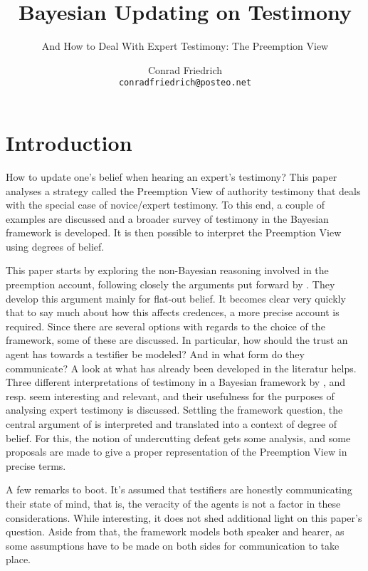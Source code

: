 \documentclass[11pt, a4paper]{scrartcl}
\title{\textbf{Bayesian Updating on Testimony} }
\subtitle{And How to Deal With Expert Testimony: The Preemption View}
\author{Conrad Friedrich \\ \texttt{conradfriedrich@posteo.net}}
\begin{document}
\maketitle
\thispagestyle{empty}
\tableofcontents
\newpage
\section{Introduction}

How to update one's belief when hearing an expert's testimony? This paper analyses a strategy called the Preemption View of authority testimony that deals with the special case of novice/expert testimony. To this end, a couple of examples are discussed and a broader survey of testimony in the Bayesian framework is developed. It is then possible to interpret the Preemption View using degrees of belief. 

This paper starts by exploring the non-Bayesian reasoning involved in the preemption account, following closely the arguments put forward by \textcite{Constantin2017}. They develop this argument mainly for flat-out belief. It becomes clear very quickly that to say much about how this affects credences, a more precise account is required. Since there are several options with regards to the choice of the framework, some of these are discussed. In particular, how should the trust an agent has towards a testifier be modeled? And in what form do they communicate? A look at what has already been developed in the literatur helps. Three different interpretations of testimony in a Bayesian framework by \textcite{Goldman1999-GOLKIA}, \textcite{Bovens2003} and \textcite{Olsson2013} resp. \textcite{Angere2010} seem interesting and relevant, and their usefulness for the purposes of analysing expert testimony is discussed. Settling the framework question, the central argument of \textcite{Constantin2017} is interpreted and translated into a context of degree of belief. For this, the notion of undercutting defeat gets some analysis, and some proposals are made to give a proper representation of the Preemption View in precise terms. 

A few remarks to boot. It's assumed that testifiers are honestly communicating their state of mind, that is, the veracity of the agents is not a factor in these considerations. While interesting, it does not shed additional light on this paper's question. Aside from that, the framework models both speaker and hearer, as some assumptions have to be made on both sides for communication to take place. 
\end{document}

